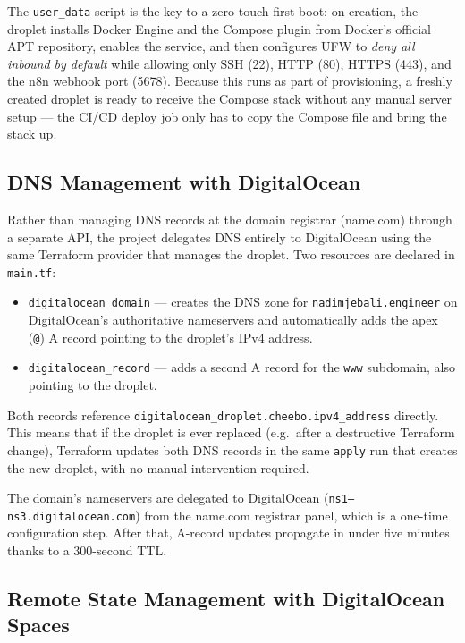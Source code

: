\documentclass[12pt, a4paper, oneside]{report}
\begin{document}
The \texttt{user\_data} script is the key to a zero-touch first boot:
on creation, the droplet installs Docker Engine and the Compose
plugin from Docker's official APT repository, enables the service,
and then configures UFW to \emph{deny all inbound by default} while
allowing only SSH (22), HTTP (80), HTTPS (443), and the n8n webhook
port (5678). Because this runs as part of provisioning, a freshly
created droplet is ready to receive the Compose stack without any
manual server setup --- the CI/CD deploy job only has to copy the
Compose file and bring the stack up.

\subsection{DNS Management with DigitalOcean}

Rather than managing DNS records at the domain registrar (name.com) through a
separate API, the project delegates DNS entirely to DigitalOcean using the same
Terraform provider that manages the droplet.  Two resources are declared in
\texttt{main.tf}:

\begin{itemize}
  \item \texttt{digitalocean\_domain} --- creates the DNS zone for
        \texttt{nadimjebali.engineer} on DigitalOcean's authoritative nameservers
        and automatically adds the apex (\texttt{@}) A record pointing to the
        droplet's IPv4 address.
  \item \texttt{digitalocean\_record} --- adds a second A record for the
        \texttt{www} subdomain, also pointing to the droplet.
\end{itemize}

Both records reference \texttt{digitalocean\_droplet.cheebo.ipv4\_address}
directly.  This means that if the droplet is ever replaced (e.g.\ after a
destructive Terraform change), Terraform updates both DNS records in the same
\texttt{apply} run that creates the new droplet, with no manual intervention
required.

The domain's nameservers are delegated to DigitalOcean
(\texttt{ns1--ns3.digitalocean.com}) from the name.com registrar panel, which
is a one-time configuration step.  After that, A-record updates propagate in
under five minutes thanks to a 300-second TTL.

\subsection{Remote State Management with DigitalOcean Spaces}
\end{document}
